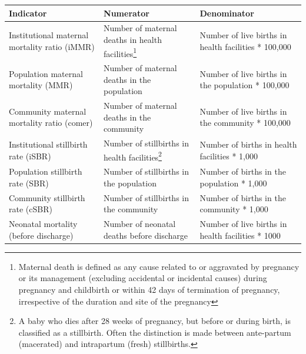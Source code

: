 \documentclass[
  english,
  letterpaper,
  DIV=11,
  numbers=noendperiod]{scrreprt}
\begin{document}
\begin{longtable}[]{@{}
  >{\raggedright\arraybackslash}p{}
  >{\raggedright\arraybackslash}p{}
  >{\raggedright\arraybackslash}p{}@{}}
\toprule\noalign{}
\begin{minipage}[b]{\linewidth}\raggedright
\textbf{Indicator}
\end{minipage} & \begin{minipage}[b]{\linewidth}\raggedright
\textbf{Numerator}
\end{minipage} & \begin{minipage}[b]{\linewidth}\raggedright
\textbf{Denominator}
\end{minipage} \\
\midrule\noalign{}
\endhead
\bottomrule\noalign{}
\endlastfoot
Institutional maternal mortality ratio (iMMR) & Number of maternal
deaths in health facilities\footnote{Maternal death is defined as any
  cause related to or aggravated by pregnancy or its management
  (excluding accidental or incidental causes) during pregnancy and
  childbirth or within 42 days of termination of pregnancy, irrespective
  of the duration and site of the pregnancy} & Number of live births in
health facilities * 100,000 \\
Population maternal mortality (MMR) & Number of maternal deaths in the
population & Number of live births in the population * 100,000 \\
Community maternal mortality ratio (comer) & Number of maternal deaths
in the community & Number of live births in the community * 100,000 \\
Institutional stillbirth rate (iSBR) & Number of stillbirths in health
facilities\footnote{A baby who dies after 28 weeks of pregnancy, but
  before or during birth, is classified as a stillbirth. Often the
  distinction is made between ante-partum (macerated) and intrapartum
  (fresh) stillbirths.} & Number of births in health facilities *
1,000 \\
Population stillbirth rate (SBR) & Number of stillbirths in the
population & Number of births in the population * 1,000 \\
Community stillbirth rate (cSBR) & Number of stillbirths in the
community & Number of births in the community * 1,000 \\
Neonatal mortality (before discharge) & Number of neonatal deaths before
discharge & Number of live births in health facilities * 1000 \\
\end{longtable}
\end{document}
